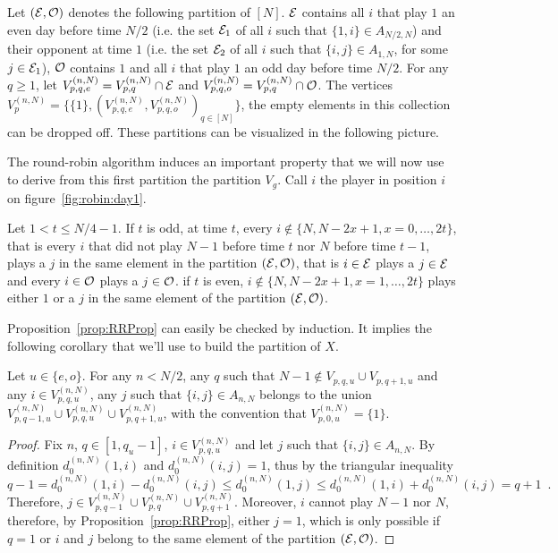 Let $(\mathcal{E},\mathcal{O})$ denotes the following partition of $[N]$. $\mathcal{E}$ contains all $i$ that play $1$ an even day before time $N/2$ (i.e. the set $\mathcal{E}_1$ of all $i$ such that $\{1,i\}\in A_{N/2,N}$) and their opponent at time $1$ (i.e. the set $\mathcal{E}_2$ of all $i$ such that $\{i,j\}\in A_{1,N}$, for some $j\in \mathcal{E}_1$), $\mathcal{O}$ contains $1$ and all $i$ that play $1$ an odd day before time $N/2$. For any $q\ge 1$, let $V^{(n,N)}_{p,q,e}=V^{(n,N)}_{p,q}\cap \mathcal{E}$ and $V^{(n,N)}_{p,q,o}=V^{(n,N)}_{p,q}\cap \mathcal{O}$. The vertices $V_p^{(n,N)}=\{\{1\},(V^{(n,N)}_{p,q,e},V^{(n,N)}_{p,q,o})_{q\in[N]}\}$, the empty elements in this collection can be dropped off. These partitions can be visualized in the following picture.

 

The round-robin algorithm induces an important property that we will now use to derive from this first partition the partition $V_g$. Call $i$ the player in position $i$ on figure~\ref{fig:robin:day1}.

\begin{proposition}\label{prop:RRProp}
Let $1<t\le N/4-1$. If $t$ is odd, at time $t$, every $i\notin \{N,N-2x+1, x=0,\ldots,2t\}$, that is every $i$ that did not play $N-1$ before time $t$ nor $N$ before time $t-1$, plays a $j$ in the same element in the partition $(\mathcal{E},\mathcal{O})$, that is $i\in \mathcal{E}$ plays a $j\in\mathcal{E}$ and every $i\in \mathcal{O}$ plays a $j\in\mathcal{O}$. if $t$ is even, $i\notin \{N,N-2x+1, x=1,\ldots,2t\}$ plays either $1$ or a $j$ in the same element of the partition $(\mathcal{E},\mathcal{O})$.  
\end{proposition}

Proposition~\ref{prop:RRProp} can easily be checked by induction. It implies the following corollary that we'll use to build the partition of $X$.

\begin{corollary}
Let $u\in\{e,o\}$. For any $n<N/2$, any $q$ such that $N-1\notin V_{p,q,u}\cup V_{p,q+1,u}$ and any $i\in V^{(n,N)}_{p,q,u}$, any $j$ such that $\{i,j\}\in A_{n,N}$ belongs to the union $V^{(n,N)}_{p,q-1,u}\cup V^{(n,N)}_{p,q,u}\cup V^{(n,N)}_{p,q+1,u}$, with the convention that $V^{(n,N)}_{p,0,u}=\{1\}$.
\end{corollary}
\begin{proof}
 Fix $n$, $q\in[1,q_u-1]$, $i\in V_{p,q,u}^{(n,N)}$ and let $j$ such that $\{i,j\}\in A_{n,N}$. By definition $d_0^{(n,N)}(1,i)$ and $d_0^{(n,N)}(i,j)=1$, thus by the triangular inequality
 \[
q-1= d^{(n,N)}_0(1,i)-d^{(n,N)}_0(i,j)\le d^{(n,N)}_0(1,j)\le d^{(n,N)}_0(1,i)+d^{(n,N)}_0(i,j)=q+1\enspace.
 \]
 Therefore, $j\in V^{(n,N)}_{p,q-1}\cup V^{(n,N)}_{p,q}\cup V^{(n,N)}_{p,q+1}$. Moreover, $i$ cannot play $N-1$ nor $N$, therefore, by Proposition~\ref{prop:RRProp}, either $j=1$, which is only possible if $q=1$ or $i$ and $j$ belong to the same element of the partition $(\mathcal{E},\mathcal{O})$.
\end{proof}

